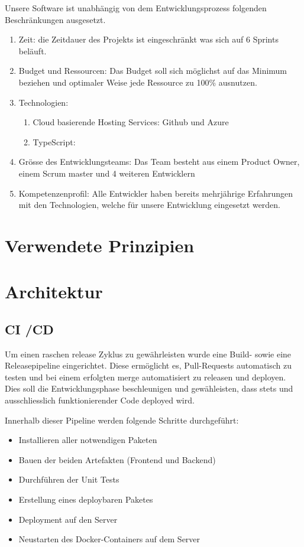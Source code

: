 \documentclass[a4paper, 11pt]{scrartcl}
\let\oldsection\section
\renewcommand\section{\clearpage\oldsection}
\begin{document}
Unsere Software ist unabhängig von dem Entwicklungsprozess folgenden Beschränkungen ausgesetzt.
\begin{enumerate}
\item Zeit: die Zeitdauer des Projekts ist eingeschränkt was sich auf 6 Sprints beläuft.
\item Budget und Ressourcen: Das Budget soll sich möglichst auf das Minimum beziehen und optimaler Weise jede Ressource zu 100\% ausnutzen.
\item Technologien:
	\begin{enumerate}

	\item Cloud basierende Hosting Services: Github und Azure
	\item TypeScript:

	\end{enumerate}
\item Grösse des Entwicklungsteams: Das Team besteht aus einem Product Owner, einem Scrum master und 4 weiteren Entwicklern
\item Kompetenzenprofil: Alle Entwickler haben bereits mehrjährige Erfahrungen mit den Technologien, welche für unsere Entwicklung eingesetzt werden.
\end{enumerate}

\section{Verwendete Prinzipien}

\section{Architektur}
\subsection{CI /CD}
Um einen raschen release Zyklus zu gewährleisten wurde eine Build- sowie eine Releasepipeline eingerichtet.
Diese ermöglicht es, Pull-Requests automatisch zu testen und bei einem erfolgten merge automatisiert zu releasen und deployen.
Dies soll die Entwicklungsphase beschleunigen und gewähleisten, dass stets und ausschliesslich funktionierender Code deployed wird.

Innerhalb dieser Pipeline werden folgende Schritte durchgeführt:
\begin{itemize}
  \item Installieren aller notwendigen Paketen
  \item Bauen der beiden Artefakten (Frontend und Backend)
  \item Durchführen der Unit Tests
  \item Erstellung eines deploybaren Paketes
  \item Deployment auf den Server
  \item Neustarten des Docker-Containers auf dem Server
\end{itemize}
\end{document}
